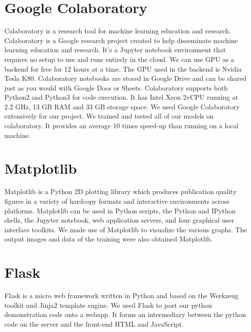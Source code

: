 \section{Google Colaboratory} %
\label{sec:google_colaboratory}
Colaboratory is a research tool for machine learning education and research. Colaboratory is a Google research project created to help disseminate machine learning education and research. It’s a Jupyter notebook environment that requires no setup to use and runs entirely in the cloud. We can use GPU as a backend for free for 12 hours at a time. The GPU used in the backend is Nvidia Tesla K80. Colaboratory notebooks are stored in Google Drive and can be shared just as you would with Google Docs or Sheets. Colaboratory supports both Python2 and Python3 for code execution. It has Intel Xeon 2vCPU running at 2.2 GHz, 13 GB RAM and 33 GB storage space.
We used Google Colaboratory extensively for our project. We trained and tested all of our models on colaboratory. It provides an average 10 times speed-up than running on a local machine. 

\section{Matplotlib} %
\label{sec:matplotlib}
Matplotlib is a Python 2D plotting library which produces publication quality figures in a variety of hardcopy formats and interactive environments across platforms. Matplotlib can be used in Python scripts, the Python and IPython shells, the Jupyter notebook, web application servers, and four graphical user interface toolkits.
We made use of Matplotlib to visualize the various graphs. The output images and data of the training were also obtained Matplotlib.

\section{Flask} %
\label{sec:flask}
Flask is a micro web framework written in Python and based on the Werkzeug toolkit and Jinja2 template engine. We used Flask to port our python demonstration code onto a webapp. It forms an intermediary between the python code on the server and the front-end HTML and JavaScript.


